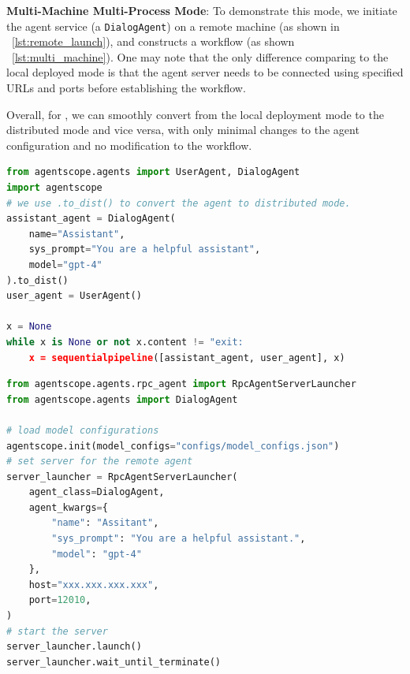 \noindent\textbf{Multi-Machine Multi-Process Mode}: To demonstrate this mode, we initiate the agent service (a \texttt{DialogAgent}) on a remote machine (as shown in \lstlistingname~\ref{lst:remote_launch}), and constructs a workflow (as shown \lstlistingname~\ref{lst:multi_machine}). One may note that the only difference comparing to the local deployed mode is that the agent server needs to be connected using specified URLs and ports before establishing the workflow.


Overall, for \ours, we can smoothly convert from the local deployment mode to the distributed mode and vice versa, with only minimal changes to the agent configuration and no modification to the workflow.

\begin{lstlisting}[language=Python, caption={Example that deploys agents in single-machine multi-process mode.}, label={lst:one_machine}, float=t]
from agentscope.agents import UserAgent, DialogAgent
import agentscope
# we use .to_dist() to convert the agent to distributed mode.
assistant_agent = DialogAgent(
    name="Assistant",
    sys_prompt="You are a helpful assistant",
    model="gpt-4"
).to_dist()
user_agent = UserAgent()

x = None
while x is None or not x.content != "exit:
	x = sequentialpipeline([assistant_agent, user_agent], x)
\end{lstlisting}

\begin{lstlisting}[language=Python, float=t, caption={Deploying a remote agent in multi-machine multi-process mode..}, label={lst:remote_launch}]
from agentscope.agents.rpc_agent import RpcAgentServerLauncher
from agentscope.agents import DialogAgent

# load model configurations
agentscope.init(model_configs="configs/model_configs.json")
# set server for the remote agent
server_launcher = RpcAgentServerLauncher(
    agent_class=DialogAgent,
    agent_kwargs={
        "name": "Assitant",
        "sys_prompt": "You are a helpful assistant.",
        "model": "gpt-4"
    },
    host="xxx.xxx.xxx.xxx",
    port=12010,
)
# start the server
server_launcher.launch()
server_launcher.wait_until_terminate()
\end{lstlisting}


